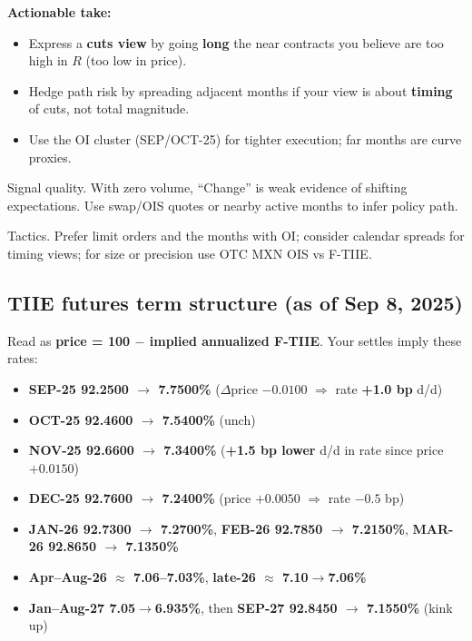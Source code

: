 \documentclass[11pt,a4paper]{article} %
\begin{document}
\textbf{Actionable take:}
\begin{itemize}
  \item Express a \textbf{cuts view} by going \textbf{long} the near contracts you believe are too high in $R$ (too low in price).
  \item Hedge path risk by spreading adjacent months if your view is about \textbf{timing} of cuts, not total magnitude.
  \item Use the OI cluster (SEP/OCT-25) for tighter execution; far months are curve proxies.
\end{itemize}

Signal quality. With zero volume, “Change” is weak evidence of shifting expectations. Use swap/OIS quotes or nearby active months to infer policy path.

Tactics. Prefer limit orders and the months with OI; consider calendar spreads for timing views; for size or precision use OTC MXN OIS vs F-TIIE.



\subsection{TIIE futures term structure (as of Sep 8, 2025)}


Read as \textbf{price = 100 $-$ implied annualized F-TIIE}. Your settles imply these rates:

\begin{itemize}
  \item \textbf{SEP-25 92.2500 $\rightarrow$ 7.7500\%} ($\Delta$price $-0.0100$ $\Rightarrow$ rate \textbf{+1.0 bp} d/d)
  \item \textbf{OCT-25 92.4600 $\rightarrow$ 7.5400\%} (unch)
  \item \textbf{NOV-25 92.6600 $\rightarrow$ 7.3400\%} (\textbf{+1.5 bp lower} d/d in rate since price $+0.0150$)
  \item \textbf{DEC-25 92.7600 $\rightarrow$ 7.2400\%} (price $+0.0050$ $\Rightarrow$ rate $-0.5$ bp)
  \item \textbf{JAN-26 92.7300 $\rightarrow$ 7.2700\%}, \textbf{FEB-26 92.7850 $\rightarrow$ 7.2150\%}, \textbf{MAR-26 92.8650 $\rightarrow$ 7.1350\%}
  \item \textbf{Apr--Aug-26 $\approx$ 7.06--7.03\%}, \textbf{late-26 $\approx$ 7.10$\rightarrow$7.06\%}
  \item \textbf{Jan--Aug-27 7.05$\rightarrow$6.935\%}, then \textbf{SEP-27 92.8450 $\rightarrow$ 7.1550\%} (kink up)
\end{itemize}
\end{document}
